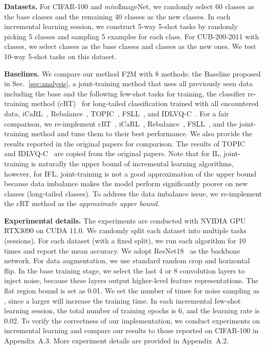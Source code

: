 \documentclass{article}
\begin{document}
 
\textbf{Datasets.} For CIFAR-100 and \textit{mini}ImageNet, we randomly select 60 classes as the base classes and the remaining 40 classes as the new classes. In each incremental learning session, we construct 5-way 5-shot tasks by randomly picking 5 classes and sampling 5 examples for each class. For CUB-200-2011 with  classes, we select  classes as the base classes and  classes as the new ones. We test 10-way 5-shot tasks on this dataset. 



\textbf{Baselines.}
We compare our method F2M with 8 methods: the Baseline proposed in Sec.~\ref{sec:analysis}, a joint-training method that uses all previously seen data including the base and the following few-shot tasks for training, the classifier re-training method (cRT)~\cite{cRT} for long-tailed classification trained with all encountered data, iCaRL~\cite{icarl}, Rebalance~\cite{NCM}, TOPIC~\cite{TOPIC}, FSLL~\cite{FSLL}, and IDLVQ-C~\cite{IDLVQC}. For a fair comparison, we re-implement cRT~\cite{cRT}, iCaRL~\cite{icarl}, Rebalance~\cite{NCM}, FSLL~\cite{FSLL}, and the joint-training method and tune them to their best performance. We also provide the results reported in the original papers for comparison. The results of TOPIC~\cite{TOPIC} and IDLVQ-C~\cite{IDLVQC} are copied from the original papers.
Note that for IL, joint-training is naturally the upper bound of incremental learning algorithms, however, for IFL, joint-training is not a good approximation of the upper bound 
because data imbalance makes the model perform significantly poorer on new classes (long-tailed classes).
To address the data imbalance issue, we re-implement 
the cRT method as the \textit{approximate upper bound}. 


\textbf{Experimental details.} The experiments are conducted with NVIDIA GPU RTX3090 on CUDA 11.0. We randomly split each dataset into multiple tasks (sessions). For each dataset (with a fixed split), we run each algorithm for 10 times
and report the mean accuracy.
We adopt ResNet18~\cite{he2016deep} as the backbone network. 
For data augmentation, we use standard random crop and horizontal flip. In the base training stage, we select the last 4 or 8 convolution layers to inject noise, because these layers output higher-level feature representations. The flat region bound  is set as 0.01. We set the number of times for noise sampling as , since a larger  will increase the training time.
In each incremental few-shot learning session, the total number of training epochs is 6, and the learning rate is 0.02. To verify the correctness of our implementation, we conduct experiments on incremental learning and compare our results to those reported on CIFAR-100 in Appendix~A.3. More experiment details are provided in Appendix~A.2. 
\end{document}
